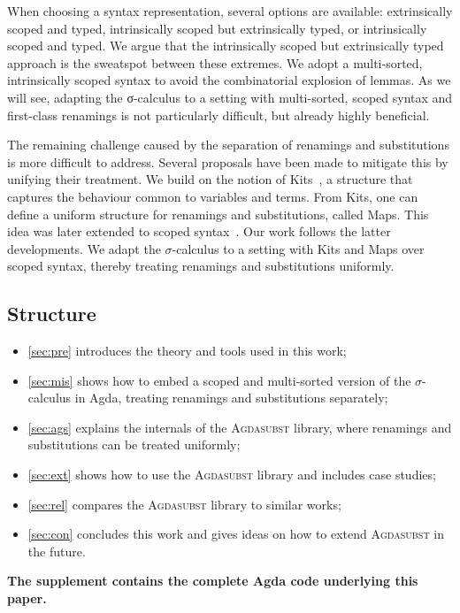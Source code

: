 \documentclass[screen,nonacm]{acmart}
\begin{document}
When choosing a syntax representation, several options are available:
extrinsically scoped and typed, intrinsically scoped but extrinsically typed,
or intrinsically scoped and typed. We argue that the intrinsically scoped but
extrinsically typed approach is the sweatspot between these extremes. We adopt
a multi-sorted, intrinsically scoped syntax to avoid the combinatorial
explosion of lemmas. As we will see, adapting the σ-calculus to a setting with
multi-sorted, scoped syntax and first-class renamings is not particularly
difficult, but already highly beneficial.

The remaining challenge caused by the separation of renamings and substitutions
is more difficult to address. Several proposals have been made to mitigate this
by unifying their treatment. We build on the notion of Kits~\cite{CITE1}, a
structure that captures the behaviour common to variables and terms. From Kits,
one can define a uniform structure for renamings and substitutions, called
Maps. This idea was later extended to scoped syntax~\cite{CITE2}. Our work
follows the latter developments. We adapt the $σ$-calculus to a setting with
Kits and Maps over scoped syntax, thereby treating renamings and substitutions
uniformly.
\subsection*{Structure}

\begin{itemize}
      \item \cref{sec:pre} introduces the theory and tools used in this work;
      \item \cref{sec:mis} shows how to embed a scoped and multi-sorted version of the $\sigma$-calculus in Agda, treating renamings and substitutions separately;
      \item \cref{sec:ags} explains the internals of the \textsc{Agdasubst} library, where renamings and substitutions can be treated uniformly;
      \item \cref{sec:ext} shows how to use the \textsc{Agdasubst} library and includes case studies;
      \item \cref{sec:rel} compares the \textsc{Agdasubst} library to similar works;
      \item \cref{sec:con} concludes this work and gives ideas on how to extend \textsc{Agdasubst} in the future.
\end{itemize}

\noindent\textbf{The supplement contains the complete Agda code underlying this paper.}
\end{document}
